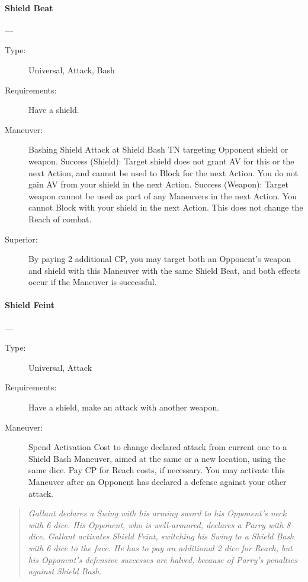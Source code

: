 \documentclass[oneside,11pt,english]{book}
\begin{document}
\paragraph{\large\label{man:Shield Beat}Shield Beat}---\quad{\large[X+2]}
\vspace{-10pt}\begin{description} 
\item [Type:] Universal, Attack, Bash 
\item [Requirements:] Have a shield.
\item [Maneuver:] Bashing Shield Attack at Shield Bash TN targeting Opponent shield or weapon. 
Success (Shield): Target shield does not grant AV for this or the next Action, and cannot be used to Block 
for the next Action. You do not gain AV from your shield in the next Action. 
Success (Weapon): Target weapon cannot be used as part of any Maneuvers in the next Action. You 
cannot Block with your shield in the next Action. This does not change the Reach of combat. 
\item [Superior:] By paying 2 additional CP, you may target both an Opponent’s weapon and shield with this 
Maneuver with the same Shield Beat, and both effects occur if the Maneuver is successful. 
\end{description}
\paragraph{\large\label{man:Shield Feint}Shield Feint}---\quad{\large[1]}
\vspace{-10pt}\begin{description} 
\item [Type:] Universal, Attack 
\item [Requirements:] Have a shield, make an attack with another weapon. 
\item [Maneuver:] Spend Activation Cost to change declared attack from current one to a Shield Bash 
Maneuver, aimed at the same or a new location, using the same dice. Pay CP for Reach costs, if 
necessary. You may activate this Maneuver after an Opponent has declared a defense against your other 
attack. 
\end{description}
\begin{quotation}
\emph{Gallant declares a Swing with his arming sword to his Opponent’s neck with 6 dice. His Opponent, who is well-armored, 
declares a Parry with 8 dice. Gallant activates Shield Feint, switching his Swing to a Shield Bash with 6 dice to the face. He has 
to pay an additional 2 dice for Reach, but his Opponent’s defensive successes are halved, because of Parry’s penalties against 
Shield Bash.}
\end{quotation}
\end{document}
